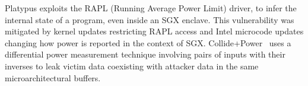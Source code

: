 Platypus \cite{Lipp2021Platypus} exploits the RAPL (Running Average Power Limit) driver, to infer the internal state of a program, even inside an SGX enclave. This vulnerability was mitigated by kernel updates restricting RAPL access and Intel microcode updates changing how power is reported in the context of SGX.
Collide+Power~\cite{kogler2023collide+} uses a differential power measurement technique involving pairs of inputs with their inverses to leak victim data coexisting with attacker data in the same microarchitectural buffers. 



